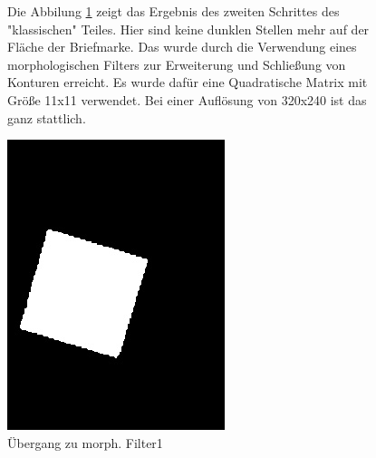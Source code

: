 \documentclass[12pt,toc=bib,toc=listof]{scrreprt}
\begin{document}
\begin{figure}[h]
\begin{minipage}[t]{.6\linewidth}

Die Abbilung \ref{fig:bv_morph1} zeigt das Ergebnis des zweiten Schrittes des "klassischen" Teiles. Hier sind keine dunklen Stellen mehr auf der Fläche der Briefmarke. Das wurde durch die Verwendung eines morphologischen Filters zur Erweiterung und Schließung von Konturen erreicht. Es wurde dafür eine Quadratische Matrix mit Größe 11x11 verwendet. Bei einer Auflösung von 320x240 ist das ganz stattlich.
\end{minipage}
\begin{minipage}[t]{.2\linewidth}
\strut\vspace*{-\baselineskip}
\newline
  \includegraphics[width=\linewidth]{./bilder/bin1morph}
  \caption{Übergang zu morph. Filter1}
  \label{fig:bv_morph1}
\end{minipage}
\end{figure}
\end{document}
